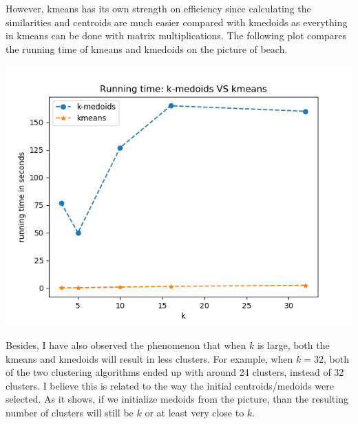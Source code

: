 \documentclass[twoside,10pt]{article}
\begin{document}
\begin{enumerate}
    However, kmeans has its own strength on efficiency since calculating the similarities and centroids are much easier compared with kmedoids as everything in kmeans can be done with matrix multiplications. The following plot compares the running time of kmeans and kmedoids on the picture of beach.
    \begin{center}
        \includegraphics[scale=.5]{images/run_time_compare.png}
    \end{center}
    
    Besides, I have also observed the phenomenon that when $k$ is large, both the kmeans and kmedoids will result in less clusters. For example, when $k = 32$, both of the two clustering algorithms ended up with around 24 clusters, instead of 32 clusters. I believe this is related to the way the initial centroids/medoids were selected. As it shows, if we initialize medoids from the picture, than the resulting number of clusters will still be $k$ or at least very close to $k$.

\end{enumerate}
\end{document}
